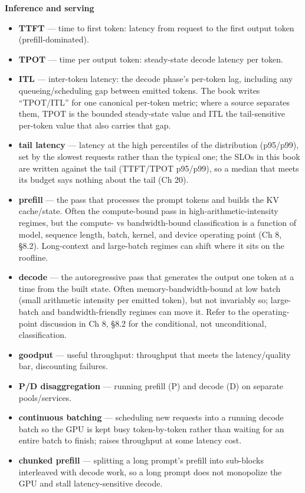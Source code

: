 \noindent\textbf{Inference and serving}
\begin{itemize}\tightlist
\item \textbf{TTFT} — time to first token: latency from request to the first output token (prefill-dominated).
\item \textbf{TPOT} — time per output token: steady-state decode latency per token.
\item \textbf{ITL} — inter-token latency: the decode phase's per-token lag, including any queueing/scheduling gap between emitted tokens. The book writes ``TPOT/ITL'' for one canonical per-token metric; where a source separates them, TPOT is the bounded steady-state value and ITL the tail-sensitive per-token value that also carries that gap.
\item \textbf{tail latency} — latency at the high percentiles of the distribution (p95/p99), set by the slowest requests rather than the typical one; the SLOs in this book are written against the tail (TTFT/TPOT p95/p99), so a median that meets its budget says nothing about the tail (Ch 20).
\item \textbf{prefill} — the pass that processes the prompt tokens and builds the KV cache/state. Often the compute-bound pass in high-arithmetic-intensity regimes, but the compute- vs bandwidth-bound classification is a function of model, sequence length, batch, kernel, and device operating point (Ch 8, \S8.2). Long-context and large-batch regimes can shift where it sits on the roofline.
\item \textbf{decode} — the autoregressive pass that generates the output one token at a time from the built state. Often memory-bandwidth-bound at low batch (small arithmetic intensity per emitted token), but not invariably so; large-batch and bandwidth-friendly regimes can move it. Refer to the operating-point discussion in Ch 8, \S8.2 for the conditional, not unconditional, classification.
\item \textbf{goodput} — useful throughput: throughput that meets the latency/quality bar, discounting failures.
\item \textbf{P/D disaggregation} — running prefill (P) and decode (D) on separate pools/services.
\item \textbf{continuous batching} — scheduling new requests into a running decode batch so the GPU is kept busy token-by-token rather than waiting for an entire batch to finish; raises throughput at some latency cost.
\item \textbf{chunked prefill} — splitting a long prompt's prefill into sub-blocks interleaved with decode work, so a long prompt does not monopolize the GPU and stall latency-sensitive decode.

\end{itemize}
